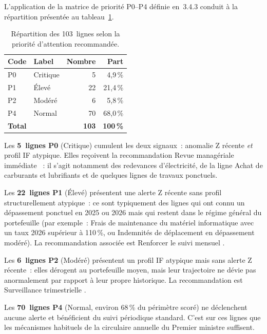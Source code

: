 L'application de la matrice de priorit\'e P0--P4 d\'efinie en~3.4.3 conduit
\`a la r\'epartition pr\'esent\'ee au tableau~\ref{tab:p0-p4}.

\begin{table}[h]
\centering
\caption{R\'epartition des 103~lignes selon la priorit\'e d'attention recommand\'ee.}
\label{tab:p0-p4}
\begin{tabular}{llrr}
\toprule
\textbf{Code} & \textbf{Label} & \textbf{Nombre} & \textbf{Part} \\
\midrule
P0 & Critique & 5   & 4{,}9\,\%  \\
P1 & \'Elev\'e & 22 & 21{,}4\,\% \\
P2 & Mod\'er\'e & 6 & 5{,}8\,\%  \\
P4 & Normal & 70   & 68{,}0\,\% \\
\midrule
\textbf{Total} & & \textbf{103} & \textbf{100\,\%} \\
\bottomrule
\end{tabular}
\end{table}

Les \textbf{5~lignes P0} (Critique) cumulent les deux signaux~: anomalie Z
r\'ecente \emph{et} profil IF atypique. Elles re\c{c}oivent la recommandation
\og Revue manag\'eriale imm\'ediate \fg{}~: il s'agit notamment des
redevances d'\'electricit\'e, de la ligne \og Achat de carburants et
lubrifiants \fg{} et de quelques lignes de travaux ponctuels.

Les \textbf{22~lignes P1} (\'Elev\'e) pr\'esentent une alerte Z r\'ecente
sans profil structurellement atypique~: ce sont typiquement des lignes qui
ont connu un d\'epassement ponctuel en 2025 ou 2026 mais qui restent dans
le r\'egime g\'en\'eral du portefeuille (par exemple~: \og Frais de
maintenance du mat\'eriel informatique \fg{} avec un taux 2026 sup\'erieur
\`a 110\,\%, ou \og Indemnit\'es de d\'eplacement \fg{} en d\'epassement
mod\'er\'e). La recommandation associ\'ee est \og Renforcer le suivi
mensuel \fg{}.

Les \textbf{6~lignes P2} (Mod\'er\'e) pr\'esentent un profil IF atypique mais
sans alerte Z r\'ecente~: elles d\'erogent au portefeuille moyen, mais leur
trajectoire ne d\'evie pas anormalement par rapport \`a leur propre
historique. La recommandation est \og Surveillance trimestrielle \fg{}.

Les \textbf{70~lignes P4} (Normal, environ 68\,\% du p\'erim\`etre scor\'e)
ne d\'eclenchent aucune alerte et b\'en\'eficient du suivi p\'eriodique
standard. C'est sur ces lignes que les m\'ecanismes habituels de la
circulaire annuelle du Premier ministre suffisent.


